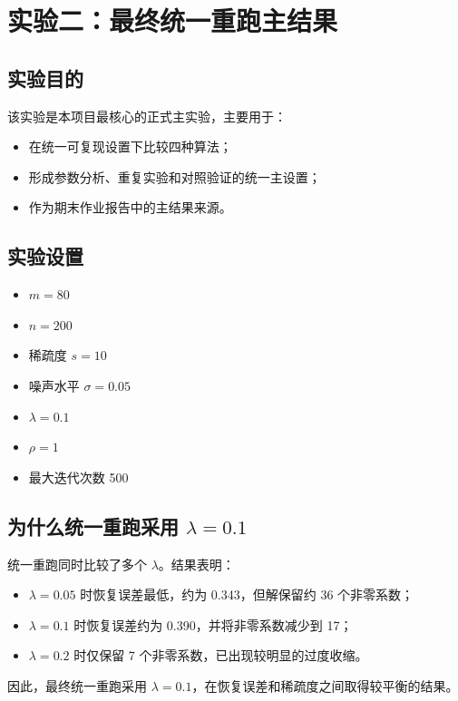\documentclass[12pt,a4paper]{ctexart}
\begin{document}
\section{实验二：最终统一重跑主结果}
\subsection{实验目的}
该实验是本项目最核心的正式主实验，主要用于：
\begin{itemize}[leftmargin=2em]
    \item 在统一可复现设置下比较四种算法；
    \item 形成参数分析、重复实验和对照验证的统一主设置；
    \item 作为期末作业报告中的主结果来源。
\end{itemize}

\subsection{实验设置}
\begin{itemize}[leftmargin=2em]
    \item $m=80$
    \item $n=200$
    \item 稀疏度 $s=10$
    \item 噪声水平 $\sigma=0.05$
    \item $\lambda=0.1$
    \item $\rho=1$
    \item 最大迭代次数 500
\end{itemize}

\subsection{为什么统一重跑采用 $\lambda=0.1$}
统一重跑同时比较了多个 $\lambda$。结果表明：
\begin{itemize}[leftmargin=2em]
    \item $\lambda=0.05$ 时恢复误差最低，约为 0.343，但解保留约 36 个非零系数；
    \item $\lambda=0.1$ 时恢复误差约为 0.390，并将非零系数减少到 17；
    \item $\lambda=0.2$ 时仅保留 7 个非零系数，已出现较明显的过度收缩。
\end{itemize}
因此，最终统一重跑采用 $\lambda=0.1$，在恢复误差和稀疏度之间取得较平衡的结果。
\end{document}
